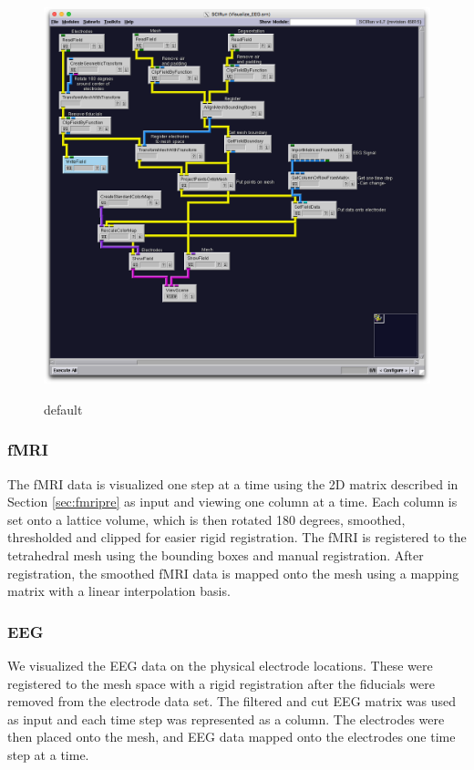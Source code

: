 \begin{figure}[p]
\begin{center}
\includegraphics[width=\textwidth]{Figures/EEG_network.png}\\
\caption{default}
\label{default}
\end{center}
\end{figure} 

\subsubsection{fMRI}

The fMRI data is visualized one step at a time using the 2D matrix described in Section \ref{sec:fmripre} as input and viewing one column at a time. Each column is set onto a lattice volume, which is then rotated 180 degrees, smoothed, thresholded and clipped for easier rigid registration. The fMRI is registered to the tetrahedral mesh using the bounding boxes and manual registration. After registration, the smoothed fMRI data is mapped onto the mesh using a mapping matrix with a linear interpolation basis. 

\subsubsection{EEG}

We visualized the EEG data on the physical electrode locations. These were registered to the mesh space with a rigid registration after the fiducials were removed from the electrode data set. The filtered and cut EEG matrix was used as input and each time step was represented as a column. The electrodes were then placed onto the mesh, and EEG data mapped onto the electrodes one time step at a time. 

\newpage
